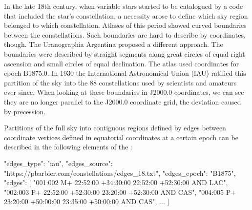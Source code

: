 In the late 18th century, when variable stars started to be catalogued by a code that included the star's constellation, 
a necessity arose to define which sky region belonged to which constellation. 
Atlases of this period showed curved boundaries between the constellations. 
Such boundaries are hard to describe by coordinates, though. The Uranographia Argentina proposed a different approach.
The boundaries were described by straight segments along great circles of equal right ascension and small circles of equal declination. 
The atlas used coordinates for epoch B1875.0. 
In 1930 the International Astronomical Union (IAU) ratified  this partition of the sky into the 88 constellations used by scientists and amateurs ever since.
When looking at these boundaries in J2000.0 coordinates, we can see they are no longer parallel to the J2000.0 coordinate grid, the deviation caused by precession. 

Partitions of the full sky into contiguous regions defined by edges between coordinate vertices defined in  
equatorial coordinates at a certain  epoch can be described in the following elements of the :

\begin{jsonfile}[\scriptsize]
  "edges_type": "iau",
  "edges_source": "https://pbarbier.com/constellations/edges_18.txt",
  "edges_epoch": "B1875",
  "edges": [
    "001:002 M+ 22:52:00 +34:30:00 22:52:00 +52:30:00 AND LAC",
    "002:003 P+ 22:52:00 +52:30:00 23:20:00 +52:30:00 AND CAS",
    "004:005 P+ 23:20:00 +50:00:00 23:35:00 +50:00:00 AND CAS",
	...
	]
\end{jsonfile}


